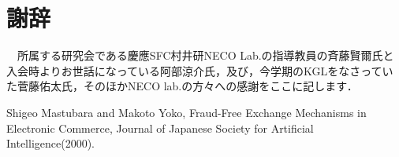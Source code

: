 \documentclass[twocolumn, a4j]{article}
\begin{document}
\section*{謝辞}
　所属する研究会である慶應SFC村井研NECO Lab.の指導教員の斉藤賢爾氏と入会時よりお世話になっている阿部涼介氏，及び，今学期のKGLをなさっていた菅藤佑太氏，そのほかNECO lab.の方々への感謝をここに記します．

\renewcommand{\refname}{参考文献}
\begin{thebibliography}{数字}
   Shigeo Mastubara and Makoto Yoko, Fraud-Free Exchange Mechanisms in Electronic Commerce, Journal of Japanese Society for Artificial Intelligence(2000).
\end{thebibliography}
\end{document}
